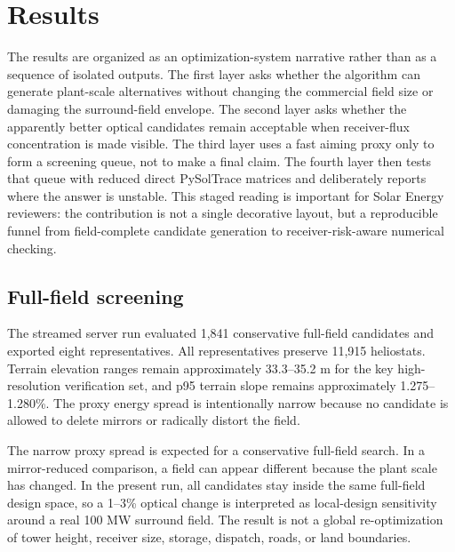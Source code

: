 \documentclass[final,3p,times]{elsarticle}
\begin{document}
\section{Results}
The results are organized as an optimization-system narrative rather than as a sequence of isolated outputs. The first layer asks whether the algorithm can generate plant-scale alternatives without changing the commercial field size or damaging the surround-field envelope. The second layer asks whether the apparently better optical candidates remain acceptable when receiver-flux concentration is made visible. The third layer uses a fast aiming proxy only to form a screening queue, not to make a final claim. The fourth layer then tests that queue with reduced direct PySolTrace matrices and deliberately reports where the answer is unstable. This staged reading is important for Solar Energy reviewers: the contribution is not a single decorative layout, but a reproducible funnel from field-complete candidate generation to receiver-risk-aware numerical checking.

\subsection{Full-field screening}
The streamed server run evaluated 1,841 conservative full-field candidates and exported eight representatives. All representatives preserve 11,915 heliostats. Terrain elevation ranges remain approximately 33.3--35.2 m for the key high-resolution verification set, and p95 terrain slope remains approximately 1.275--1.280\%. The proxy energy spread is intentionally narrow because no candidate is allowed to delete mirrors or radically distort the field.

The narrow proxy spread is expected for a conservative full-field search. In a mirror-reduced comparison, a field can appear different because the plant scale has changed. In the present run, all candidates stay inside the same full-field design space, so a 1--3\% optical change is interpreted as local-design sensitivity around a real 100 MW surround field. The result is not a global re-optimization of tower height, receiver size, storage, dispatch, roads, or land boundaries.
\end{document}
